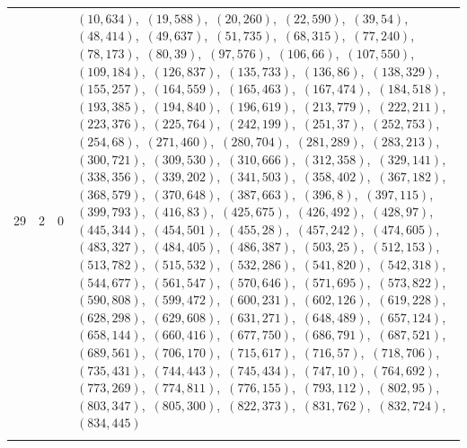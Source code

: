 \documentclass[11pt]{article}
\begin{document}
\begin{longtable}{@{}rrl>{\raggedright\arraybackslash}p{}@{}}
29 & 2 & $0$ & $(10,634)$,\allowbreak\ $(19,588)$,\allowbreak\ $(20,260)$,\allowbreak\ $(22,590)$,\allowbreak\ $(39,54)$,\allowbreak\ $(48,414)$,\allowbreak\ $(49,637)$,\allowbreak\ $(51,735)$,\allowbreak\ $(68,315)$,\allowbreak\ $(77,240)$,\allowbreak\ $(78,173)$,\allowbreak\ $(80,39)$,\allowbreak\ $(97,576)$,\allowbreak\ $(106,66)$,\allowbreak\ $(107,550)$,\allowbreak\ $(109,184)$,\allowbreak\ $(126,837)$,\allowbreak\ $(135,733)$,\allowbreak\ $(136,86)$,\allowbreak\ $(138,329)$,\allowbreak\ $(155,257)$,\allowbreak\ $(164,559)$,\allowbreak\ $(165,463)$,\allowbreak\ $(167,474)$,\allowbreak\ $(184,518)$,\allowbreak\ $(193,385)$,\allowbreak\ $(194,840)$,\allowbreak\ $(196,619)$,\allowbreak\ $(213,779)$,\allowbreak\ $(222,211)$,\allowbreak\ $(223,376)$,\allowbreak\ $(225,764)$,\allowbreak\ $(242,199)$,\allowbreak\ $(251,37)$,\allowbreak\ $(252,753)$,\allowbreak\ $(254,68)$,\allowbreak\ $(271,460)$,\allowbreak\ $(280,704)$,\allowbreak\ $(281,289)$,\allowbreak\ $(283,213)$,\allowbreak\ $(300,721)$,\allowbreak\ $(309,530)$,\allowbreak\ $(310,666)$,\allowbreak\ $(312,358)$,\allowbreak\ $(329,141)$,\allowbreak\ $(338,356)$,\allowbreak\ $(339,202)$,\allowbreak\ $(341,503)$,\allowbreak\ $(358,402)$,\allowbreak\ $(367,182)$,\allowbreak\ $(368,579)$,\allowbreak\ $(370,648)$,\allowbreak\ $(387,663)$,\allowbreak\ $(396,8)$,\allowbreak\ $(397,115)$,\allowbreak\ $(399,793)$,\allowbreak\ $(416,83)$,\allowbreak\ $(425,675)$,\allowbreak\ $(426,492)$,\allowbreak\ $(428,97)$,\allowbreak\ $(445,344)$,\allowbreak\ $(454,501)$,\allowbreak\ $(455,28)$,\allowbreak\ $(457,242)$,\allowbreak\ $(474,605)$,\allowbreak\ $(483,327)$,\allowbreak\ $(484,405)$,\allowbreak\ $(486,387)$,\allowbreak\ $(503,25)$,\allowbreak\ $(512,153)$,\allowbreak\ $(513,782)$,\allowbreak\ $(515,532)$,\allowbreak\ $(532,286)$,\allowbreak\ $(541,820)$,\allowbreak\ $(542,318)$,\allowbreak\ $(544,677)$,\allowbreak\ $(561,547)$,\allowbreak\ $(570,646)$,\allowbreak\ $(571,695)$,\allowbreak\ $(573,822)$,\allowbreak\ $(590,808)$,\allowbreak\ $(599,472)$,\allowbreak\ $(600,231)$,\allowbreak\ $(602,126)$,\allowbreak\ $(619,228)$,\allowbreak\ $(628,298)$,\allowbreak\ $(629,608)$,\allowbreak\ $(631,271)$,\allowbreak\ $(648,489)$,\allowbreak\ $(657,124)$,\allowbreak\ $(658,144)$,\allowbreak\ $(660,416)$,\allowbreak\ $(677,750)$,\allowbreak\ $(686,791)$,\allowbreak\ $(687,521)$,\allowbreak\ $(689,561)$,\allowbreak\ $(706,170)$,\allowbreak\ $(715,617)$,\allowbreak\ $(716,57)$,\allowbreak\ $(718,706)$,\allowbreak\ $(735,431)$,\allowbreak\ $(744,443)$,\allowbreak\ $(745,434)$,\allowbreak\ $(747,10)$,\allowbreak\ $(764,692)$,\allowbreak\ $(773,269)$,\allowbreak\ $(774,811)$,\allowbreak\ $(776,155)$,\allowbreak\ $(793,112)$,\allowbreak\ $(802,95)$,\allowbreak\ $(803,347)$,\allowbreak\ $(805,300)$,\allowbreak\ $(822,373)$,\allowbreak\ $(831,762)$,\allowbreak\ $(832,724)$,\allowbreak\ $(834,445)$\\
\addlinespace[3pt]
\end{longtable}
\endgroup
\end{document}
